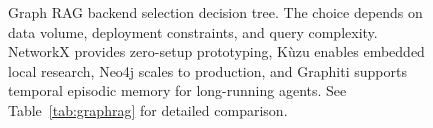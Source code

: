 \begin{figure}[htbp]
{\begin{tikzpicture}
\end{tikzpicture}
}
\caption{Graph RAG backend selection decision tree. The choice depends on data volume, deployment constraints, and query complexity. NetworkX provides zero-setup prototyping, Kùzu enables embedded local research, Neo4j scales to production, and Graphiti supports temporal episodic memory for long-running agents. See Table~\ref{tab:graphrag} for detailed comparison.}
\label{fig:graphrag_decision}
\end{figure}
